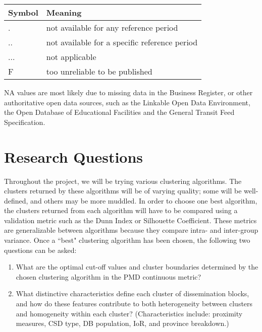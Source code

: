 \documentclass[11pt, a4paper]{article}
\begin{document}
\begin{table}[H]
\centering
\begin{tabular}{|l|l|} 
\hline
\textbf{Symbol} & \textbf{Meaning} \\
\hline
. & not available for any reference period \\ 
\hline 
.. & not available for a specific reference period \\ 
\hline 
... & not applicable \\ 
\hline 
F & too unreliable to be published \\ 
\hline 
\end{tabular}
\end{table}

NA values are most likely due to missing data in the Business Register, or other authoritative open data sources, such as the Linkable Open Data Environment, the Open Database of Educational Facilities and the General Transit Feed Specification. 



\section*{Research Questions}

Throughout the project, we will be trying various clustering algorithms. The clusters returned by these algorithms will be of varying quality; some will be well-defined, and others may be more muddled. In order to choose one best algorithm, the clusters returned from each algorithm will have to be compared using a validation metric such as the Dunn Index or Silhouette Coefficient. These metrics are generalizable between algorithms because they compare intra- and inter-group variance. Once a ``best" clustering algorithm has been chosen, the following two questions can be asked:

\begin{enumerate}
\item What are the optimal cut-off values and cluster boundaries determined by the chosen clustering algorithm in the PMD continuous metric? 
\item What distinctive characteristics define each cluster of dissemination blocks, and how do these features contribute to both heterogeneity between clusters and homogeneity within each cluster? (Characteristics include: proximity measures, CSD type, DB population, IoR, and province breakdown.) 
\end{enumerate}
\end{document}

